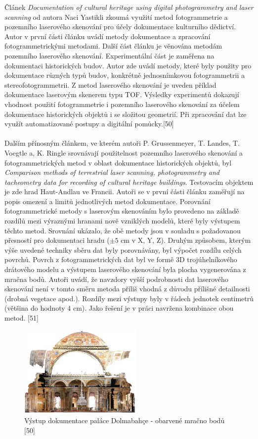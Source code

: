 \documentclass[a4paper, 12pt]{report}
\begin{document}
Článek \textit{Documentation of cultural heritage using digital
photogrammetry and laser scanning} od autora Naci Yastikli zkoumá využití metod fotogrammetrie a pozemního laserového skenování pro účely dokumentace kulturního dědictví. Autor v první části článku uvádí metody dokumentace a zpracování fotogrammetrickými metodami. Další část článku je věnována metodám pozemního laserového skenování. Experimentální část je zaměřena na dokumentaci historických budov. Autor zde uvádí metody, které byly použity pro dokumentace různých typů budov, konkrétně jednosnímkovou fotogrammetrii a stereofotogrammetrii. Z metod laserového skenování je uveden příklad dokumentace laserovým skenerem typu TOF. Výsledky experimentů dokazují vhodnost použití fotogrammetrie i pozemního laserového skenování za účelem dokumentace historických objektů i se složitou geometrií. Při zpracování dat lze využít automatizované postupy a digitální pomůcky.[50]\\
\\
Dalším přínosným článkem, ve kterém autoři P. Grussenmeyer, T. Landes, T. Voegtle a, K. Ringle srovnávají použitelnost pozemního laserového skenování a fotogrammetrických metod v oblast dokumentace historických objektů, byl \textit{Comparison methods of terrestrial laser scanning, photogrammetry and tacheometry data for recording of cultural heritage buildings}. Testovacím objektem je zde hrad Haut-Andlau ve Francii. Autoři se v první části článku zaměřují na popis omezení a limitů jednotlivých metod dokumentace. Porovnání fotogrammetrické metody s laserovým skenováním bylo provedeno na základě rozdílů mezi výraznými hranami nově vzniklých modelů, které byly výstupem těchto metod. Srovnání ukázalo, že obě metody jsou v souladu s požadovanou přesností pro dokumentaci hradu ($\pm 5$ cm v X, Y, Z). Druhým způsobem, kterým výše uvedené techniky sběru dat byly porovnávány, byl výpočet rozdílu celých povrchů. Povrch z fotogrammetrických dat byl ve formě 3D trojúhelníkového drátového modelu a výstupem laserového skenování byla plocha vygenerována z mračna bodů. Autoři uvádí, že navzdory vyšší podrobnosti dat laserového skenování není v tomto směru metoda příliš vhodná z důvodu přílišné detailnosti (drobná vegetace apod.). Rozdíly mezi výstupy byly v řádech jednotek centimetrů (většina do hodnoty 4 cm). Jako řešení je v práci navržena kombinace obou metod. [51]

\begin{figure}[h!]
	\centering
	\includegraphics[width=6cm]{laser_scanning.jpg}
	\caption{Výstup dokumentace paláce Dolmabahçe - obarvené mračno bodů [50]}
\end{figure}
\end{document}

